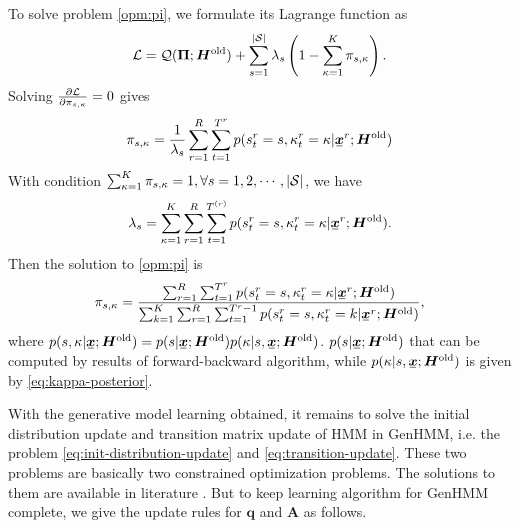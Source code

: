 \documentclass[letterpaper]{article} %
\newcommand{\ubar}[1]{\mkern2mu\underline{\mkern-2mu #1\mkern-2mu}\mkern2mu}
\newcommand{\ubm}[1]{\ubar{\bm{#1}}}
\newcommand{\ubmr}[2]{\ubar{\bm{#1}}^{#2}}
\newcommand{\smtr}[3]{{#1}^{#3}_{#2}}
\begin{document}
To solve problem \eqref{opm:pi}, we formulate its Lagrange function as
\begin{equation}
  \mathcal{L} = \mathcal{Q}(\bm{\Pi}; \bm{H}^{\mathrm{old}}) + \sum_{s=1}^{|\mathcal{S}|} \lambda_s\left( 1-  \sum_{\kappa=1}^{K}\pi_{s, \kappa}  \right).
\end{equation}
Solving $\frac{ \partial \mathcal{L}}{\partial \pi_{s, \kappa}} = 0$ gives
\begin{equation}
  \pi_{s,\kappa} = \frac{1}{\lambda_s}\sum_{r=1}^{R} \sum_{t=1}^{{T}^{r}} p(\smtr{s}{t}{r}=s, \smtr{\kappa}{t}{r} =\kappa| \ubmr{x}{r}; \bm{H}^{\mathrm{old}})
\end{equation}
With condition $\sum_{\kappa=1}^{K} \pi_{s, \kappa}= 1, \forall s = 1, 2, \cdots, |\mathcal{S}|$, we have
\begin{equation}
  \lambda_s = \sum_{\kappa=1}^{K}\sum_{r=1}^{R} \sum_{t=1}^{{T}^{(r)}} p(\smtr{s}{t}{r}=s, \smtr{\kappa}{t}{r} =\kappa | \ubmr{x}{r}; \bm{H}^{\mathrm{old}}).
\end{equation}
Then the solution to \eqref{opm:pi} is
\begin{equation}\label{eq:mix-latent-parameter-solution}
  \pi_{s, \kappa} = \frac{\sum_{r=1}^{R} \sum_{t=1}^{{T}^{r}} p(\smtr{s}{t}{r} =s, \smtr{\kappa}{t}{r}=\kappa | \ubmr{x}{r}; \bm{H}^{\mathrm{old}}) }{\sum_{k =1}^{K}\sum_{r=1}^{R} \sum_{t=1}^{{T}^{r}-1} p(\smtr{s}{t}{r} =s, \smtr{\kappa}{t}{r}=k | \ubmr{x}{r}; \bm{H}^{\mathrm{old}}) },
\end{equation}
where $p(s, \kappa | \ubm{x}; \bm{H}^{\mathrm{old}}) = p(s| \ubm{x}; \bm{H}^{\mathrm{old}}) p(\kappa | s, \ubm{x}; \bm{H}^{\mathrm{old}})$. $p(s| \ubm{x}; \bm{H}^{\mathrm{old}})$ that can be computed by results of forward-backward algorithm, while $p(\kappa | s, \ubm{x}; \bm{H}^{\mathrm{old}})$ is given by \eqref{eq:kappa-posterior}.


With the generative model learning obtained, it remains to solve the initial distribution update and transition matrix update of HMM in GenHMM, i.e. the problem \eqref{eq:init-distribution-update} and \eqref{eq:transition-update}. These two problems are basically two constrained optimization problems. The solutions to them are available in literature \cite{Bishop:2006:PRM:1162264}. But to keep learning algorithm for GenHMM complete, we give the update rules for $\bm{q}$ and $\bm{A}$ as follows.
\end{document}
